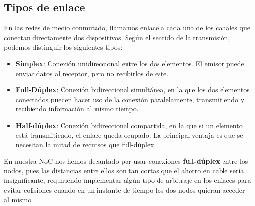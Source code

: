 \subsection{Tipos de enlace}
En las redes de medio conmutado, llamamos enlace a cada uno de los canales que conectan directamente dos dispositivos.
Según el sentido de la transmisión, podemos distinguir los siguientes tipos:

\begin{itemize}
    \item \textbf{Símplex}: Conexión unidireccional entre los dos elementos. El emisor puede enviar datos al receptor, pero no recibirlos de este.
    \item \textbf{Full-Dúplex}: Conexión bidireccional simultánea, en la que los dos elementos conectados pueden hacer uso de la conexión paralelamente, transmitiendo y recibiendo información al mismo tiempo.
    \item \textbf{Half-dúplex}: Conexión bidireccional compartida, en la que si un elemento está transmitiendo, el enlace queda ocupado. La principal ventaja es que se necesitan la mitad de recursos que full-dúplex.
\end{itemize}

\begin{recuadronoc}
    En nuestra NoC nos hemos decantado por usar conexiones \textbf{full-dúplex} entre los nodos, pues las distancias entre ellos son tan cortas que el ahorro en cable sería insignificante, requiriendo implementar algún tipo de arbitraje en los enlaces para evitar colisiones cuando en un instante de tiempo los dos nodos quieran acceder al mismo.
\end{recuadronoc}
